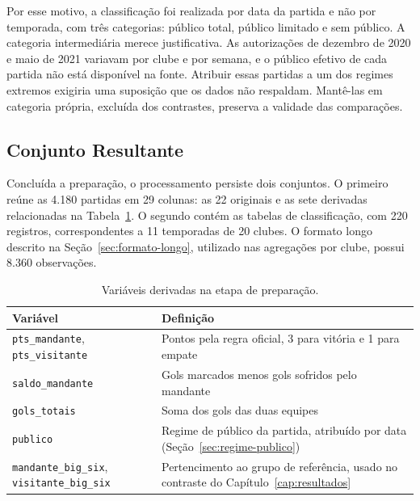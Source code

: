 Por esse motivo, a classificação foi realizada por data da partida e não por
temporada, com três categorias: público total, público limitado e sem público. A
categoria intermediária merece justificativa. As autorizações de dezembro de 2020
e maio de 2021 variavam por clube e por semana, e o público efetivo de cada
partida não está disponível na fonte. Atribuir essas partidas a um dos regimes
extremos exigiria uma suposição que os dados não respaldam. Mantê-las em
categoria própria, excluída dos contrastes, preserva a validade das
comparações.

\subsection{Conjunto Resultante}\label{sec:conjunto-resultante}

Concluída a preparação, o processamento persiste dois conjuntos. O primeiro
reúne as 4.180 partidas em 29 colunas: as 22 originais e as sete derivadas
relacionadas na Tabela~\ref{tab:derivadas}. O segundo contém as tabelas de
classificação, com 220 registros, correspondentes a 11 temporadas de 20 clubes.
O formato longo descrito na Seção~\ref{sec:formato-longo}, utilizado nas
agregações por clube, possui 8.360 observações.

\begin{table}[htb]
  \centering
  \caption{Variáveis derivadas na etapa de preparação.}
  \label{tab:derivadas}
  \small
  \begin{tabular}{@{}lp{8.3cm}@{}}
    \toprule
    \textbf{Variável} & \textbf{Definição} \\
    \midrule
    \texttt{pts\_mandante}, \texttt{pts\_visitante} &
      Pontos pela regra oficial, 3 para vitória e 1 para empate \\
    \texttt{saldo\_mandante} &
      Gols marcados menos gols sofridos pelo mandante \\
    \texttt{gols\_totais} &
      Soma dos gols das duas equipes \\
    \texttt{publico} &
      Regime de público da partida, atribuído por data
      (Seção~\ref{sec:regime-publico}) \\
    \texttt{mandante\_big\_six}, \texttt{visitante\_big\_six} &
      Pertencimento ao grupo de referência, usado no contraste do
      Capítulo~\ref{cap:resultados} \\
    \bottomrule
  \end{tabular}
\end{table}


